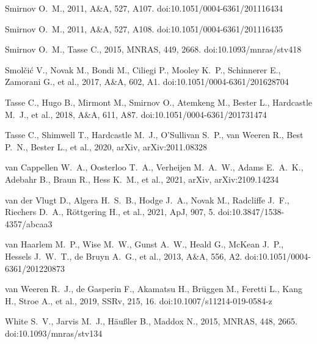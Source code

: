 \documentclass[usenatbib,usedcolumn]{mnras}
\begin{document}
\begin{thebibliography}{}
 Smirnov O.~M., 2011, A\&A, 527, A107. doi:10.1051/0004-6361/201116434

 Smirnov O.~M., 2011, A\&A, 527, A108. doi:10.1051/0004-6361/201116435

 Smirnov O.~M., Tasse C., 2015, MNRAS, 449, 2668. doi:10.1093/mnras/stv418

 Smol{\v{c}}i{\'c} V., Novak M., Bondi M., Ciliegi P., Mooley K.~P., Schinnerer E., Zamorani G., et al., 2017, A\&A, 602, A1. doi:10.1051/0004-6361/201628704

 Tasse C., Hugo B., Mirmont M., Smirnov O., Atemkeng M., Bester L., Hardcastle M.~J., et al., 2018, A\&A, 611, A87. doi:10.1051/0004-6361/201731474

 Tasse C., Shimwell T., Hardcastle M.~J., O'Sullivan S.~P., van Weeren R., Best P.~N., Bester L., et al., 2020, arXiv, arXiv:2011.08328

 van Cappellen W.~A., Oosterloo T.~A., Verheijen M.~A.~W., Adams E.~A.~K., Adebahr B., Braun R., Hess K.~M., et al., 2021, arXiv, arXiv:2109.14234

 van der Vlugt D., Algera H.~S.~B., Hodge J.~A., Novak M., Radcliffe J.~F., Riechers D.~A., R{\"o}ttgering H., et al., 2021, ApJ, 907, 5. doi:10.3847/1538-4357/abcaa3

 van Haarlem M.~P., Wise M.~W., Gunst A.~W., Heald G., McKean J.~P., Hessels J.~W.~T., de Bruyn A.~G., et al., 2013, A\&A, 556, A2. doi:10.1051/0004-6361/201220873

 van Weeren R.~J., de Gasperin F., Akamatsu H., Br{\"u}ggen M., Feretti L., Kang H., Stroe A., et al., 2019, SSRv, 215, 16. doi:10.1007/s11214-019-0584-z

 White S.~V., Jarvis M.~J., H{\"a}u{\ss}ler B., Maddox N., 2015, MNRAS, 448, 2665. doi:10.1093/mnras/stv134


\end{thebibliography}
\end{document}
